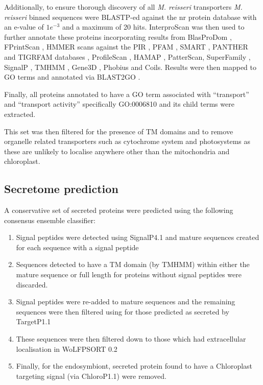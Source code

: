 Additionally, to ensure thorough discovery of 
all \textit{M. reisseri} transporters \textit{M. reisseri} binned sequences 
were BLASTP-ed against the nr protein database with an e-value of \(1e^{-3}\) and 
a maximum of 20 hits.
InterproScan \citep{Zdobnov2001a} was then used to 
further annotate these proteins incorporating
results from BlasProDom \citep{Servant2002}, FPrintScan \citep{Attwood1994}, 
HMMER \citep{Mistry2013} scans against the PIR \citep{Barker1998}, PFAM \citep{Bateman2002}, 
SMART \citep{Schultz1998}, PANTHER \citep{Thomas2003a} and TIGRFAM databases \citep{Haft2003}, 
ProfileScan \citep{Gribskov1988},
HAMAP \citep{Lima2009}, PatterScan, 
SuperFamily \citep{Gough2002}, 
SignalP \citep{Petersen2011}, TMHMM \citep{Sonnhammer1998}, 
Gene3D \citep{Buchan2002}, Phobius \citep{Kall2007}
and Coils. Results were then mapped to GO terms \citep{Ashburner2000,Harris2004}
and annotated via BLAST2GO \citep{Conesa2005a}.

Finally, all proteins annotated to have a GO term associated with ``transport'' and
``transport activity'' specifically GO:0006810 and its child
terms were extracted.  

This set was then filtered for the presence of TM domains and to remove
organelle related transporters such as cytochrome system and photosystems
as these are unlikely to localise anywhere other than the mitochondria
and chloroplast.

\subsection{Secretome prediction}
A conservative set of secreted proteins were predicted 
using the following consensus ensemble classifier:
\begin{enumerate}
    \item Signal peptides were detected using SignalP4.1 and mature sequences
        created for each sequence with a signal peptide
    \item Sequences detected to have a TM domain (by TMHMM) within either the mature sequence or 
        full length for proteins without signal peptides were discarded.
    \item Signal peptides were re-added to mature sequences and the 
        remaining sequences were then filtered using for those predicted as secreted by TargetP1.1 
    \item These sequences were then filtered down to those which had extracellular
        localisation in WoLFPSORT 0.2 
    \item Finally, for the endosymbiont, secreted protein found to have a Chloroplast
        targeting signal (via ChloroP1.1) were removed.
\end{enumerate}

